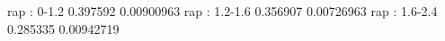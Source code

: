 rap : 0-1.2
0.397592 0.00900963
rap : 1.2-1.6
0.356907 0.00726963
rap : 1.6-2.4
0.285335 0.00942719
